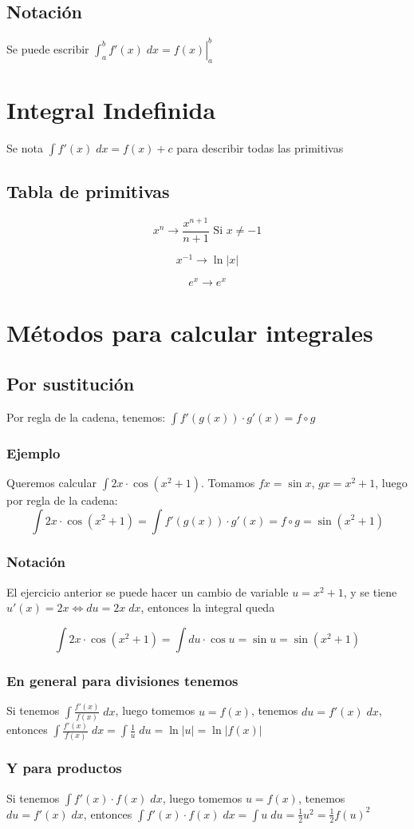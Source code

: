 \documentclass{article}
\begin{document}
\subsection{Notación}
Se puede escribir \(
\left. \int_a^b f'(x)\; dx = f(x)\right| _a^b
\)
\section{Integral Indefinida}
Se nota \(
\int f'(x) \; dx = f(x) + c
\) para describir todas las primitivas
\subsection{Tabla de primitivas}
\[
	x^n \to \frac{x^{n+1}}{n+1} \text{ Si $x \neq -1$}
\]

\[
	x^{-1} \to \ln |x|
\]

\[
	e^x \to e^x
\]

\section{Métodos para calcular integrales}
\subsection{Por sustitución}
Por regla de la cadena, tenemos: \(
\int f'(g(x)) \cdot g'(x) = f \circ g
\)
\subsubsection{Ejemplo}
Queremos calcular \(
\int 2x \cdot \cos(x^2 +1 )
\). Tomamos $fx = \sin x$, $g x = x^2 + 1$, luego por regla de la cadena:
\[
	\int 2x \cdot \cos(x^2 +1 ) = \int f'(g(x)) \cdot g'(x) = f \circ g =
	\sin (x^2 + 1)
\]
\subsubsection{Notación}
El ejercicio anterior se puede hacer un cambio de variable $u = x^2 + 1$, y
se tiene $u'(x) = 2x \iff du = 2x \; dx$, entonces la integral queda

\[
	\int 2x \cdot \cos(x^2 +1 ) = \int du \cdot \cos u = \sin u = \sin
	(x^2+1)
\]

\subsubsection{En general para divisiones tenemos}
Si tenemos \(
\int \frac{f'(x)}{f(x)} \; dx
\), luego tomemos $u = f(x)$, tenemos $du = f'(x) \; dx$, entonces
\(
\int \frac{f'(x)}{f(x)} \; dx = \int \frac{1}{u} \; du = \ln |u| = \ln |f(x)|
\)

\subsubsection{Y para productos}
Si tenemos \(
\int f'(x)\cdot f(x) \; dx
\), luego tomemos $u = f(x)$, tenemos $du = f'(x) \; dx$, entonces
\(
\int f'(x) \cdot f(x) \; dx = \int u \; du = \frac{1}{2}u^2 =
\frac{1}{2}f(u)^2
\)
\end{document}
